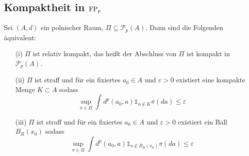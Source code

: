 \subsection{Kompaktheit in \texorpdfstring{$\operatorname{FP}_p$}{FPp}}

\begin{theorem}\label{thm:prokhorov_in_pp}
    Sei $(A, d)$ ein polnischer Raum, $\Pi\subseteq\mathcal{P}_p(A)$. Dann sind die Folgenden äquivalent:
    \begin{enumerate}
        \item[(i)] $\Pi$ ist relativ kompakt, das heißt der Abschluss von $\Pi$ ist kompakt in $\mathcal{P}_p(A)$.
        \item[(ii)] $\Pi$ ist straff und für ein fixiertes $a_0 \in A$ und $\varepsilon>0$ existiert eine kompakte Menge $K\subset A$ sodass
        $$\sup_{\pi \in \Pi} \int d^p(a_0, a)\mathds{1}_{a \notin K} \pi(da) \leq \varepsilon$$
        \item[(iii)] $\Pi$ ist straff und für ein fixiertes $a_0 \in A$ und $\varepsilon>0$ existiert ein Ball $B_R(x_0)$ sodass
        $$\sup_{\pi \in \Pi} \int d^p(a_0, a)\mathds{1}_{a \notin B_R(x_0)} \pi(da) \leq \varepsilon$$
    \end{enumerate}
\end{theorem}
